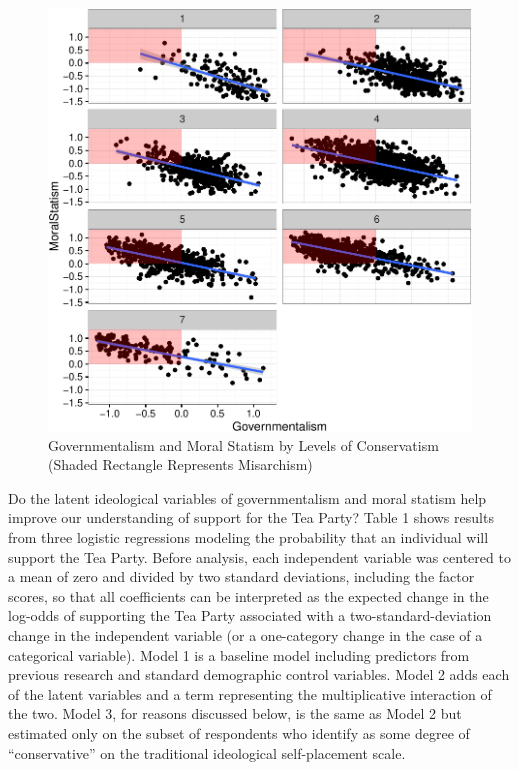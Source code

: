 \documentclass[12pt,]{article}
\begin{document}
\begin{figure}[htbp]
\centering
\includegraphics{figures/exploratoryplot-1.pdf}
\caption{Governmentalism and Moral Statism by Levels of Conservatism
(Shaded Rectangle Represents Misarchism)}
\end{figure}

Do the latent ideological variables of governmentalism and moral statism
help improve our understanding of support for the Tea Party? Table 1
shows results from three logistic regressions modeling the probability
that an individual will support the Tea Party. Before analysis, each
independent variable was centered to a mean of zero and divided by two
standard deviations, including the factor scores, so that all
coefficients can be interpreted as the expected change in the log-odds
of supporting the Tea Party associated with a two-standard-deviation
change in the independent variable (or a one-category change in the case
of a categorical variable). Model 1 is a baseline model including
predictors from previous research and standard demographic control
variables. Model 2 adds each of the latent variables and a term
representing the multiplicative interaction of the two. Model 3, for
reasons discussed below, is the same as Model 2 but estimated only on
the subset of respondents who identify as some degree of
``conservative'' on the traditional ideological self-placement scale.
\end{document}
